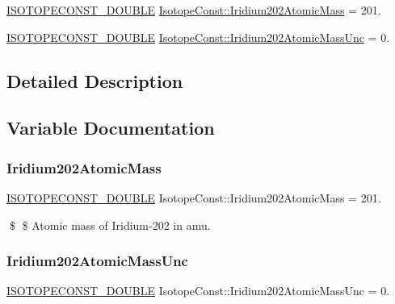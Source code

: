 \begin{DoxyCompactItemize}
\item 
\mbox{\hyperlink{group___isotope_const-_macros_ga8f45a7272ce02c0b4c65c44636ed719a}{I\+S\+O\+T\+O\+P\+E\+C\+O\+N\+S\+T\+\_\+\+D\+O\+U\+B\+LE}} \mbox{\hyperlink{group___isotope_const-_iridium-_ir202_gaae15dbc8805d82680b53dacdc4fd9ecc}{Isotope\+Const\+::\+Iridium202\+Atomic\+Mass}} = 201.
\item 
\mbox{\hyperlink{group___isotope_const-_macros_ga8f45a7272ce02c0b4c65c44636ed719a}{I\+S\+O\+T\+O\+P\+E\+C\+O\+N\+S\+T\+\_\+\+D\+O\+U\+B\+LE}} \mbox{\hyperlink{group___isotope_const-_iridium-_ir202_ga835466e18287c8e9c521efe203abec4b}{Isotope\+Const\+::\+Iridium202\+Atomic\+Mass\+Unc}} = 0.
\end{DoxyCompactItemize}


\subsection{Detailed Description}


\subsection{Variable Documentation}
\mbox{\label{group___isotope_const-_iridium-_ir202_gaae15dbc8805d82680b53dacdc4fd9ecc}} 
\subsubsection{\texorpdfstring{Iridium202\+Atomic\+Mass}{Iridium202AtomicMass}}
{\footnotesize\ttfamily \mbox{\hyperlink{group___isotope_const-_macros_ga8f45a7272ce02c0b4c65c44636ed719a}{I\+S\+O\+T\+O\+P\+E\+C\+O\+N\+S\+T\+\_\+\+D\+O\+U\+B\+LE}} Isotope\+Const\+::\+Iridium202\+Atomic\+Mass = 201.}

\$ \$ Atomic mass of Iridium-\/202 in amu. \mbox{\label{group___isotope_const-_iridium-_ir202_ga835466e18287c8e9c521efe203abec4b}} 
\subsubsection{\texorpdfstring{Iridium202\+Atomic\+Mass\+Unc}{Iridium202AtomicMassUnc}}
{\footnotesize\ttfamily \mbox{\hyperlink{group___isotope_const-_macros_ga8f45a7272ce02c0b4c65c44636ed719a}{I\+S\+O\+T\+O\+P\+E\+C\+O\+N\+S\+T\+\_\+\+D\+O\+U\+B\+LE}} Isotope\+Const\+::\+Iridium202\+Atomic\+Mass\+Unc = 0.}

